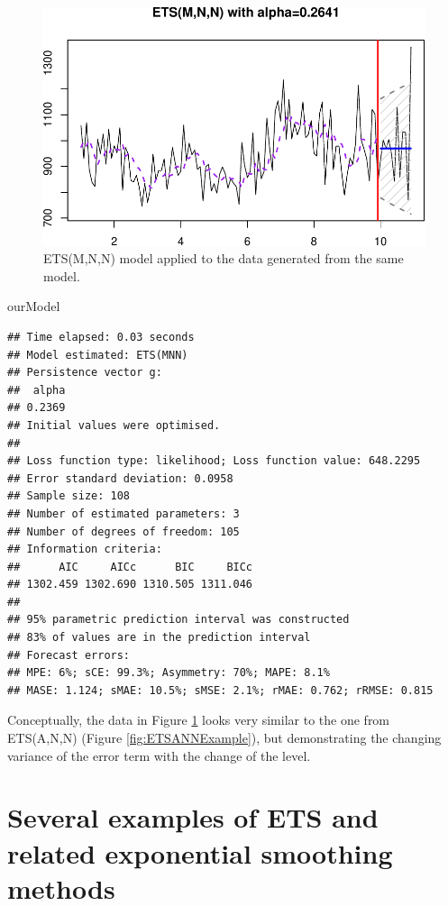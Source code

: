 \documentclass[
]{book}
\newenvironment{Shaded}{\begin{snugshade}}{\end{snugshade}}
\newcommand{\NormalTok}[1]{#1}
\theoremstyle{definition}
\theoremstyle{definition}
\theoremstyle{definition}
\theoremstyle{definition}
\theoremstyle{remark}
\begin{document}
\begin{figure}
\centering
\includegraphics{Svetunkov--2022----ADAM_files/figure-latex/ETSMNNExample-1.pdf}
\caption{\label{fig:ETSMNNExample}ETS(M,N,N) model applied to the data generated from the same model.}
\end{figure}

\begin{Shaded}
\begin{Highlighting}[]
\NormalTok{ourModel}
\end{Highlighting}
\end{Shaded}

\begin{verbatim}
## Time elapsed: 0.03 seconds
## Model estimated: ETS(MNN)
## Persistence vector g:
##  alpha 
## 0.2369 
## Initial values were optimised.
## 
## Loss function type: likelihood; Loss function value: 648.2295
## Error standard deviation: 0.0958
## Sample size: 108
## Number of estimated parameters: 3
## Number of degrees of freedom: 105
## Information criteria:
##      AIC     AICc      BIC     BICc 
## 1302.459 1302.690 1310.505 1311.046 
## 
## 95% parametric prediction interval was constructed
## 83% of values are in the prediction interval
## Forecast errors:
## MPE: 6%; sCE: 99.3%; Asymmetry: 70%; MAPE: 8.1%
## MASE: 1.124; sMAE: 10.5%; sMSE: 2.1%; rMAE: 0.762; rRMSE: 0.815
\end{verbatim}

Conceptually, the data in Figure \ref{fig:ETSMNNExample} looks very similar to the one from ETS(A,N,N) (Figure \ref{fig:ETSANNExample}), but demonstrating the changing variance of the error term with the change of the level.

\hypertarget{ETSExamples}{%
\section{Several examples of ETS and related exponential smoothing methods}\label{ETSExamples}}
\end{document}
